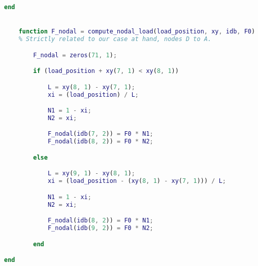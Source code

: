 \begin{lstlisting}[language=Matlab]
    end


    function F_nodal = compute_nodal_load(load_position, xy, idb, F0)
    % Strictly related to our case at hand, nodes D to A.

        F_nodal = zeros(71, 1);

        if (load_position + xy(7, 1) < xy(8, 1))

            L = xy(8, 1) - xy(7, 1);
            xi = (load_position) / L;

            N1 = 1 - xi;
            N2 = xi;

            F_nodal(idb(7, 2)) = F0 * N1;
            F_nodal(idb(8, 2)) = F0 * N2;

        else

            L = xy(9, 1) - xy(8, 1);
            xi = (load_position - (xy(8, 1) - xy(7, 1))) / L;

            N1 = 1 - xi;
            N2 = xi;

            F_nodal(idb(8, 2)) = F0 * N1;
            F_nodal(idb(9, 2)) = F0 * N2;

        end

end

\end{lstlisting}
